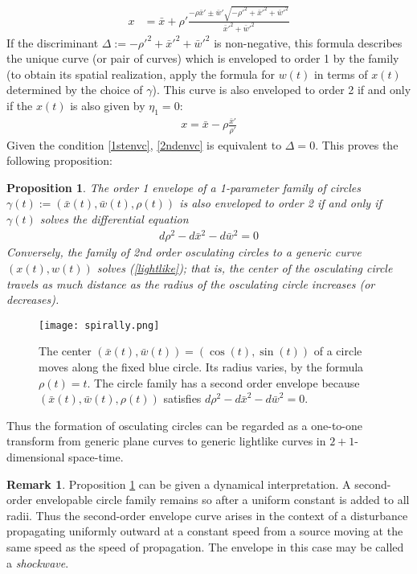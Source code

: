 \documentclass[12pt]{article}
\numberwithin{equation}{section}
\theoremstyle{plain}
\newtheorem{proposition}[definition]{Proposition}
\theoremstyle{definition}
\newtheorem{remark}[definition]{Remark}
\begin{document}
\begin{align}\label{1stenvc}
x&=\bar{x}+\rho'\frac{-\rho\bar{x}'  \pm \bar{w}'\sqrt{-\rho'^{2}+\bar{x}'^{2}+\bar{w}'^{2}}}{\bar{x}'^{2}+\bar{w}'^{2}}
\end{align}
If the discriminant $\Delta:=-\rho'^{2}+\bar{x}'^{2}+\bar{w}'^{2}$ is non-negative, this formula describes the unique curve (or pair of curves) which is enveloped to order 1 by the family (to obtain its spatial realization, apply the formula for $w(t)$ in terms of $x(t)$ determined by the choice of $\gamma$). This curve is also enveloped to order 2 if and only if the $x(t)$ is also given by $\eta_{1}=0$:
\begin{align}\label{2ndenvc}
x=\bar{x}-\rho\frac{\bar{x}'}{\rho'}
\end{align}
Given the condition \ref{1stenvc}, \ref{2ndenvc} is equivalent to $\Delta=0$. This proves the following proposition:
\begin{proposition}\label{circlesenvs} The order 1 envelope of a 1-parameter family of circles $\gamma(t):=(\bar{x}(t),\bar{w}(t),\rho(t))$ is also enveloped to order 2 if and only if $\gamma(t)$ solves the differential equation
\begin{align}\label{lightlike}
d\rho^{2}-d\bar{x}^{2}-d\bar{w}^{2}=0
\end{align}
Conversely, the family of 2nd order osculating circles to a generic curve $(x(t),w(t))$ solves (\ref{lightlike}); that is, the center of the osculating circle travels as much distance as the radius of the osculating circle increases (or decreases).
\end{proposition}
\begin{figure}[H]\label{circleshockwave}
 \centering
   \texttt{[image: spirally.png]}
   \caption{The center $(\bar{x}(t),\bar{w}(t))=(\cos(t),\sin(t))$ of a circle moves along the fixed blue circle. Its radius varies, by the formula $\rho(t)=t$. The circle family has a second order envelope because $(\bar{x}(t),\bar{w}(t),\rho(t))$ satisfies $d\rho^{2}-d\bar{x}^{2}-d\bar{w}^{2}=0$.}
\end{figure}

Thus the formation of osculating circles can be regarded as a one-to-one transform from generic plane curves to generic lightlike curves in $2+1$-dimensional space-time.

\begin{remark} Proposition \ref{circlesenvs} can be given a dynamical interpretation. A second-order envelopable circle family remains so after a uniform constant is added to all radii. Thus the second-order envelope curve arises in the context of a disturbance propagating uniformly outward at a constant speed from a source moving at the same speed as the speed of propagation. The envelope in this case may be called a \emph{shockwave}.
\end{remark}
\end{document}
